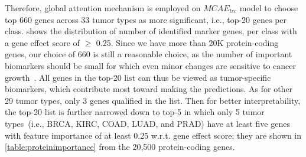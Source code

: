 \hspace*{3.5mm} Therefore, global attention mechanism is employed on $MCAE_{lrc}$ model to choose top 660 genes across 33 tumor types as more significant, i.e., top-20 genes per class.
 shows the distribution of number of identified marker genes, per class with a gene effect score of $\geq$ 0.25. Since we have more than 20K protein-coding genes, our choice of 660 is still a reasonable choice, as the number of important biomarkers should be small for which even minor changes are sensitive to cancer growth~\cite{zuo2019identification}. All genes in the top-20 list can thus be viewed as tumor-specific biomarkers, which contribute most toward making the predictions. As for other 29 tumor types, only 3 genes qualified in the list. %
Then for better interpretability, the top-20 list is further narrowed down to top-5 in which only 5 tumor types~(i.e., BRCA, KIRC, COAD, LUAD, and PRAD) have at least five genes with feature importance of at least 0.25 w.r.t. gene effect score; they are shown in \cref{table:proteinimportance} from the 20,500 protein-coding genes. 

